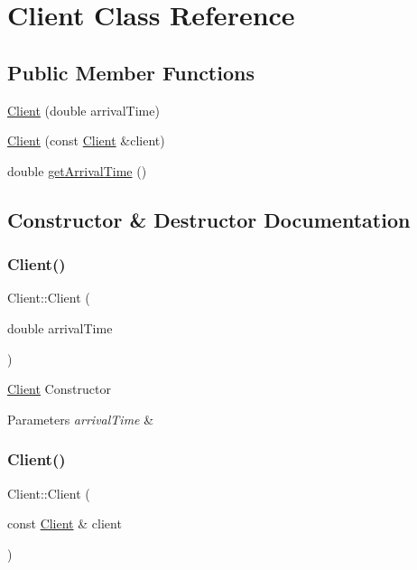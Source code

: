 \hypertarget{classClient}{}\section{Client Class Reference}
\label{classClient}
\subsection*{Public Member Functions}
\begin{DoxyCompactItemize}
\item 
\hyperlink{classClient_a1540718bfe0d1c040821fc2f4598dea1}{Client} (double arrival\+Time)
\item 
\hyperlink{classClient_ab74cbe8124ada5342d56030bd608876b}{Client} (const \hyperlink{classClient}{Client} \&client)
\item 
double \hyperlink{classClient_a748d86e8c875f10a5d92c3cf2a12e621}{get\+Arrival\+Time} ()
\end{DoxyCompactItemize}


\subsection{Constructor \& Destructor Documentation}
\mbox{\label{classClient_a1540718bfe0d1c040821fc2f4598dea1}} 
\subsubsection{\texorpdfstring{Client()}{Client()}\hspace{0.1cm}{\footnotesize\ttfamily [1/2]}}
{\footnotesize\ttfamily Client\+::\+Client (\begin{DoxyParamCaption}\item[{double}]{arrival\+Time }\end{DoxyParamCaption})\hspace{0.3cm}{\ttfamily [explicit]}}

\hyperlink{classClient}{Client} Constructor 
\begin{DoxyParams}{Parameters}
{\em arrival\+Time} & \\
\hline
\end{DoxyParams}
\mbox{\label{classClient_ab74cbe8124ada5342d56030bd608876b}} 
\subsubsection{\texorpdfstring{Client()}{Client()}\hspace{0.1cm}{\footnotesize\ttfamily [2/2]}}
{\footnotesize\ttfamily Client\+::\+Client (\begin{DoxyParamCaption}\item[{const \hyperlink{classClient}{Client} \&}]{client }\end{DoxyParamCaption})}

